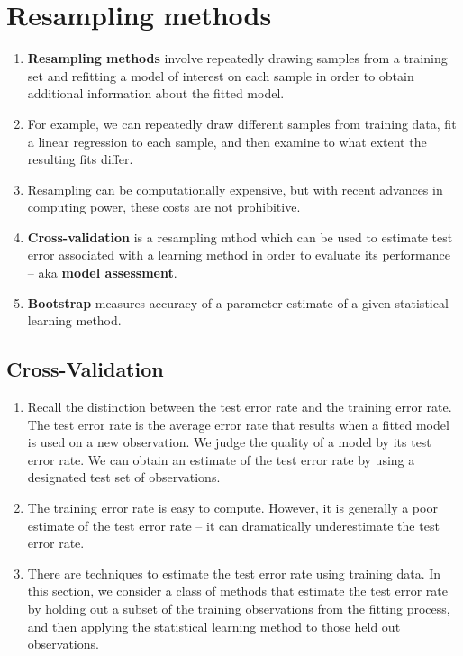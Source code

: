 \documentclass[10pt]{article}
\begin{document}
\section{Resampling methods}

\begin{enumerate}
	\item \textbf{Resampling methods} involve repeatedly drawing samples from a training set and refitting a model of interest on each sample in order to obtain additional information about the fitted model.
	\item For example, we can repeatedly draw different samples from training data, fit a linear regression to each sample, and then examine to what extent the resulting fits differ.
	\item Resampling can be computationally expensive, but with recent advances in computing power, these costs are not prohibitive.
	\item \textbf{Cross-validation} is a resampling mthod which can be used to estimate test error associated with a learning method in order to evaluate its performance -- aka \textbf{model assessment}.
	\item \textbf{Bootstrap} measures accuracy of a parameter estimate of a given statistical learning method.
\end{enumerate}

\subsection{Cross-Validation} 
\begin{enumerate}
	\item Recall the distinction between the test error rate and the training error rate.  The test error rate is the average error rate that results when a fitted model is used on a new observation.  We judge the quality of a model by its test error rate.  We can obtain an estimate of the test error rate by using a designated test set of observations.
	\item The training error rate is easy to compute.  However, it is generally a poor estimate of the test error rate -- it can dramatically underestimate the test error rate.
	\item There are techniques to estimate the test error rate using training data.  In this section, we consider a class of methods that estimate the test error rate by holding out a subset of the training observations from the fitting process, and then applying the statistical learning method to those held out observations. 
\end{enumerate}
\end{document}
